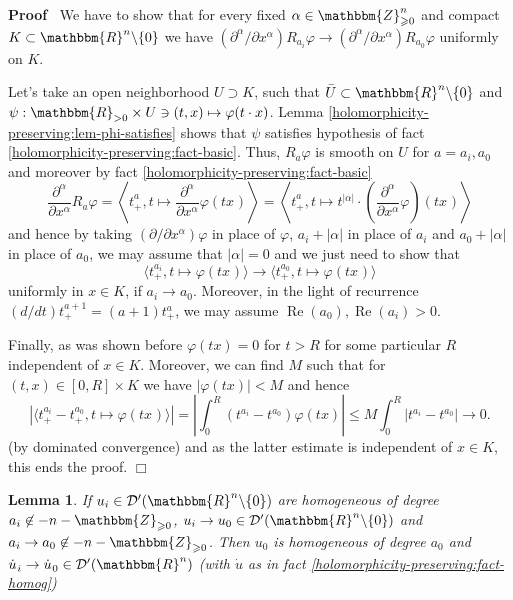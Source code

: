 \documentclass{article}
\newcommand{\nin}{\not\in}
\newcommand{\tmop}[1]{\ensuremath{\operatorname{#1}}}
\newenvironment{proof}{\noindent\textbf{Proof\ }}{\hspace*{\fill}$\Box$\medskip}
\numberwithin{definition}{section}
\newtheorem{lemma}{Lemma}
\numberwithin{lemma}{section}
\numberwithin{proposition}{section}
{\theorembodyfont{\rmfamily}\newtheorem{remark}{Remark}
\numberwithin{remark}{section}
}
\begin{document}
\begin{proof}
  We have to show that for every fixed $\alpha \in \mathbbm{Z}_{\geqslant
  0}^n$ and compact $K \subset \mathbbm{R}^n \backslash \{ 0 \}$ we have $(
  \partial^{\alpha} / \partial x^{\alpha}) R_{a_i} \varphi \rightarrow (
  \partial^{\alpha} / \partial x^{\alpha}) R_{a_0} \varphi$ uniformly on $K$.
  
  Let's take an open neighborhood $U \supset K$, such that $\bar{U} \subset
  \mathbbm{R}^n \backslash \{ 0 \}$ and $\psi : \mathbbm{R}_{> 0} \times U \ni
  ( t, x) \mapsto \varphi ( t \cdot x)$. Lemma
  \ref{holomorphicity-preserving:lem-phi-satisfies} shows that $\psi$
  satisfies hypothesis of fact \ref{holomorphicity-preserving:fact-basic}.
  Thus, $R_a \varphi$ is smooth on $U$ for $a = a_i, a_0$ and moreover by fact
  \ref{holomorphicity-preserving:fact-basic}
  \[ \frac{\partial^{\alpha}}{\partial x^{\alpha}} R_a \varphi = \left\langle
     t_+^{a_{}}, t \mapsto \frac{\partial^{\alpha}}{\partial x^{\alpha}}
     \varphi ( t x_{}) \right\rangle = \left\langle t_+^{a_{}}, t \mapsto t^{|
     \alpha |} \cdot \left( \frac{\partial^{\alpha}}{\partial x^{\alpha}}
     \varphi \right) ( t x_{}) \right\rangle \]
  and hence by taking $( \partial / \partial x^{\alpha}) \varphi$ in place of
  $\varphi$, $a_i + | \alpha |$ in place of $a_i$ and $a_0 + | \alpha |$ in
  place of $a_0$, we may assume that $| \alpha | = 0$ and we just need to show
  that
  \[ \langle t_+^{a_i}, t \mapsto \varphi ( t x_{}) \rangle \rightarrow
     \langle t_+^{a_0}, t \mapsto \varphi ( t x_{}) \rangle \]
  uniformly in $x \in K$, if $a_i \rightarrow a_0$. Moreover, in the light of
  recurrence $( d / d t) t_+^{a + 1} = ( a + 1) t_+^a$, we may assume
  $\tmop{Re} ( a_0), \tmop{Re} ( a_i) > 0$.
  
  Finally, as was shown before $\varphi ( t x) = 0$ for $t > R$ for some
  particular $R$ independent of $x \in K$. Moreover, we can find $M$ such that
  for $( t, x) \in [ 0, R] \times K$ we have $| \varphi ( t x) | < M$ and
  hence
  \[ | \langle t_+^{a_i} - t_+^{a_0}, t \mapsto \varphi ( t x_{}) \rangle | =
     \left| \int_0^R ( t^{a_i} - t^{a_0}) \varphi ( t x) \right| \leqslant M
     \int_0^R | t^{a_i} - t^{a_0} | \rightarrow 0. \]
  (by dominated convergence) and as the latter estimate is independent of $x
  \in K$, this ends the proof.
\end{proof}

\begin{lemma}
  \label{holomorphicity-preserving:lem-homog-ctt}If $u_i \in \mathcal{D}' (
  \mathbbm{R}^n \backslash \{ 0 \})$ are homogeneous of degree $a_i \nin - n
  -\mathbbm{Z}_{\geqslant 0}$, $u_i \rightarrow u_0 \in \mathcal{D}' (
  \mathbbm{R}^n \backslash \{ 0 \})$ and $a_i \rightarrow a_0 \nin - n
  -\mathbbm{Z}_{\geqslant 0}$. Then $u_0$ is homogeneous of degree $a_0$ and
  $\dot{u_{}}_i \rightarrow \dot{u_{}}_0 \in \mathcal{D}' ( \mathbbm{R}^n)$
  (with $\dot{u}$ as in fact \ref{holomorphicity-preserving:fact-homog})
\end{lemma}
\end{document}
